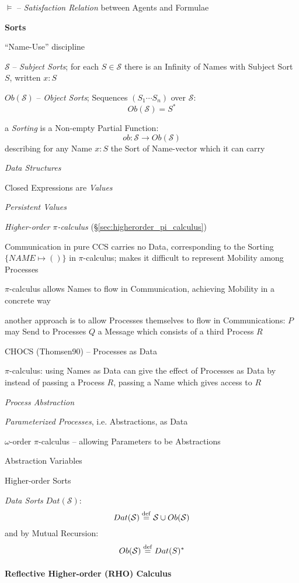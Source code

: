 $\vDash$ -- \emph{Satisfaction Relation} between Agents and Formulae


\textbf{Sorts}

``Name-Use'' discipline

$\mathcal{S}$ -- \emph{Subject Sorts}; for each $S \in \mathcal{S}$ there is an
Infinity of Names with Subject Sort $S$, written $x : S$

$Ob(\mathcal{S})$ -- \emph{Object Sorts}; Sequences $(S_1\cdots{S_n})$ over
$\mathcal{S}$:
\[
  Ob(\mathcal{S}) = S^*
\]

a \emph{Sorting} is a Non-empty Partial Function:
\[
  ob : \mathcal{S} \rightarrow Ob(\mathcal{S})
\]
describing for any Name $x : S$ the Sort of Name-vector which it can carry


\emph{Data Structures}

Closed Expressions are \emph{Values}


\emph{Persistent Values}

\emph{Higher-order $\pi$-calculus} (\S\ref{sec:higherorder_pi_calculus})

Communication in pure CCS carries no Data, corresponding to the Sorting
$\{NAME \mapsto()\}$ in $\pi$-calculus; makes it difficult to represent Mobility
among Processes

$\pi$-calculus allows Names to flow in Communication, achieving Mobility in a
concrete way

another approach is to allow Processes themselves to flow in Communications: $P$
may Send to Processes $Q$ a Message which consists of a third Process $R$

CHOCS (Thomsen90) -- Processes as Data

$\pi$-calculus: using Names as Data can give the effect of Processes as Data by
instead of passing a Process $R$, passing a Name which gives access to $R$

\emph{Process Abstraction}

\emph{Parameterized Processes}, i.e. Abstractions, as Data

$\omega$-order $\pi$-calculus -- allowing Parameters to be Abstractions

Abstraction Variables

Higher-order Sorts

\emph{Data Sorts} $Dat(\mathcal{S})$:
\[
  Dat(\mathcal{S}) \stackrel{\mathrm{def}}= \mathcal{S} \cup Ob(\mathcal{S})
\]
and by Mutual Recursion:
\[
  Ob(\mathcal{S}) \stackrel{\mathrm{def}}= Dat(S)^*
\]



\paragraph{Reflective Higher-order (RHO) Calculus}\label{sec:rho_calculus}\hfill

